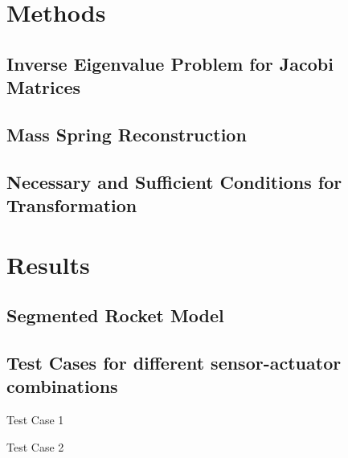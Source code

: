 \documentclass{beamer}
\begin{document}
\section{Methods}
\subsection{Inverse Eigenvalue Problem for Jacobi Matrices}
\subsection{Mass Spring Reconstruction}
\subsection{Necessary and Sufficient Conditions for Transformation}


\section{Results}

\subsection{Segmented Rocket Model}

\subsection{Test Cases for different sensor-actuator combinations}

\begin{frame}{Test Case 1}
\begin{center}
    
\end{center}
\end{frame}

\begin{frame}{Test Case 2}
\begin{center}
    
\end{center}
\end{frame}
\end{document}
